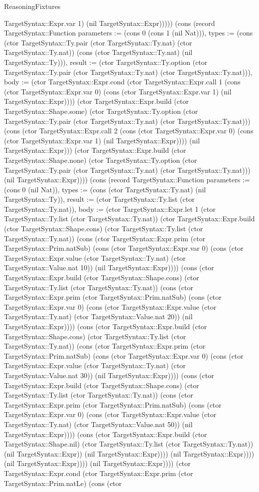 \begin{lexlean}{ReasoningFixtures}
\begin{semanticmodule}
{TargetSyntax::Expr.var 1) (nil TargetSyntax::Expr))))}) (cons (record TargetSyntax::Function {parameters := (cons 0 (cons 1 (nil Nat))), types := (cons (ctor TargetSyntax::Ty.pair (ctor TargetSyntax::Ty.nat) (ctor TargetSyntax::Ty.nat)) (cons (ctor TargetSyntax::Ty.nat) (nil TargetSyntax::Ty))), result := (ctor TargetSyntax::Ty.option (ctor TargetSyntax::Ty.pair (ctor TargetSyntax::Ty.nat) (ctor TargetSyntax::Ty.nat))), body := (ctor TargetSyntax::Expr.cond (ctor TargetSyntax::Expr.call 1 (cons (ctor TargetSyntax::Expr.var 0) (cons (ctor TargetSyntax::Expr.var 1) (nil TargetSyntax::Expr)))) (ctor TargetSyntax::Expr.build (ctor TargetSyntax::Shape.some) (ctor TargetSyntax::Ty.option (ctor TargetSyntax::Ty.pair (ctor TargetSyntax::Ty.nat) (ctor TargetSyntax::Ty.nat))) (cons (ctor TargetSyntax::Expr.call 2 (cons (ctor TargetSyntax::Expr.var 0) (cons (ctor TargetSyntax::Expr.var 1) (nil TargetSyntax::Expr)))) (nil TargetSyntax::Expr))) (ctor TargetSyntax::Expr.build (ctor TargetSyntax::Shape.none) (ctor TargetSyntax::Ty.option (ctor TargetSyntax::Ty.pair (ctor TargetSyntax::Ty.nat) (ctor TargetSyntax::Ty.nat))) (nil TargetSyntax::Expr)))}) (cons (record TargetSyntax::Function {parameters := (cons 0 (nil Nat)), types := (cons (ctor TargetSyntax::Ty.nat) (nil TargetSyntax::Ty)), result := (ctor TargetSyntax::Ty.list (ctor TargetSyntax::Ty.nat)), body := (ctor TargetSyntax::Expr.let 1 (ctor TargetSyntax::Ty.list (ctor TargetSyntax::Ty.nat)) (ctor TargetSyntax::Expr.build (ctor TargetSyntax::Shape.cons) (ctor TargetSyntax::Ty.list (ctor TargetSyntax::Ty.nat)) (cons (ctor TargetSyntax::Expr.prim (ctor TargetSyntax::Prim.natSub) (cons (ctor TargetSyntax::Expr.var 0) (cons (ctor TargetSyntax::Expr.value (ctor TargetSyntax::Ty.nat) (ctor TargetSyntax::Value.nat 10)) (nil TargetSyntax::Expr)))) (cons (ctor TargetSyntax::Expr.build (ctor TargetSyntax::Shape.cons) (ctor TargetSyntax::Ty.list (ctor TargetSyntax::Ty.nat)) (cons (ctor TargetSyntax::Expr.prim (ctor TargetSyntax::Prim.natSub) (cons (ctor TargetSyntax::Expr.var 0) (cons (ctor TargetSyntax::Expr.value (ctor TargetSyntax::Ty.nat) (ctor TargetSyntax::Value.nat 20)) (nil TargetSyntax::Expr)))) (cons (ctor TargetSyntax::Expr.build (ctor TargetSyntax::Shape.cons) (ctor TargetSyntax::Ty.list (ctor TargetSyntax::Ty.nat)) (cons (ctor TargetSyntax::Expr.prim (ctor TargetSyntax::Prim.natSub) (cons (ctor TargetSyntax::Expr.var 0) (cons (ctor TargetSyntax::Expr.value (ctor TargetSyntax::Ty.nat) (ctor TargetSyntax::Value.nat 30)) (nil TargetSyntax::Expr)))) (cons (ctor TargetSyntax::Expr.build (ctor TargetSyntax::Shape.cons) (ctor TargetSyntax::Ty.list (ctor TargetSyntax::Ty.nat)) (cons (ctor TargetSyntax::Expr.prim (ctor TargetSyntax::Prim.natSub) (cons (ctor TargetSyntax::Expr.var 0) (cons (ctor TargetSyntax::Expr.value (ctor TargetSyntax::Ty.nat) (ctor TargetSyntax::Value.nat 50)) (nil TargetSyntax::Expr)))) (cons (ctor TargetSyntax::Expr.build (ctor TargetSyntax::Shape.nil) (ctor TargetSyntax::Ty.list (ctor TargetSyntax::Ty.nat)) (nil TargetSyntax::Expr)) (nil TargetSyntax::Expr)))) (nil TargetSyntax::Expr)))) (nil TargetSyntax::Expr)))) (nil TargetSyntax::Expr)))) (ctor TargetSyntax::Expr.cond (ctor TargetSyntax::Expr.prim (ctor TargetSyntax::Prim.natLe) (cons (ctor }
\end{semanticmodule}
\end{lexlean}
